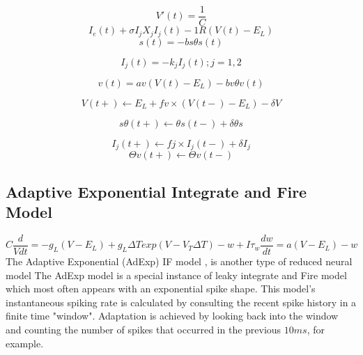 \begin{equation}
V \prime (t)=\frac{1}{C} 
\end{equation}
\begin{equation}
I_{e}(t) + \sigma I_{j}X_{j}I_{j}(t) -1R(V (t)- E_{L})  \end{equation}
\begin{equation} 
s(t) = -bs \theta s(t)  
\end{equation}

\begin{equation}
I_{j}(t) = -k_{j} I_{j} (t); j = 1, 2  
\end{equation}

\begin{equation}
 v(t) = av(V (t) - E_{L}) - bv\theta v(t) 
\end{equation}

\begin{equation}
V (t+) \leftarrow E_{L} + fv \times (V (t-) - E_{L}) - \delta V 
\end{equation}

\begin{equation}
s \theta (t+) \leftarrow \theta s(t-) + \delta \theta s 
\end{equation}

\begin{equation}
I_{j} (t+) \leftarrow fj \times I_{j} (t-) + \delta I_{j}
\end{equation}
\begin{equation}
\Theta v (t+) \leftarrow \Theta v(t-) 
\end{equation}

\subsection{Adaptive Exponential Integrate and Fire Model}
\begin{displaymath}
 C\frac{d}{Vdt}=-g_{L}(V-E_{L})+
g_{L} \Delta Texp(V-V_{T} \Delta T)-w+I 
\tau_{w}\frac{dw}{dt} = a(V-E_{L})-w 
\end{displaymath}
The Adaptive Exponential (AdExp) IF model \cite{brette2005adaptive}, is another type of reduced neural model
The AdExp model is a special instance of leaky integrate and Fire model which most often appears with an exponential spike shape.
This model's instantaneous spiking rate is calculated by consulting the recent spike history in a finite time "window". 
Adaptation is achieved by looking back into the window and counting the number of spikes that occurred in the previous $10ms$, for example. 
